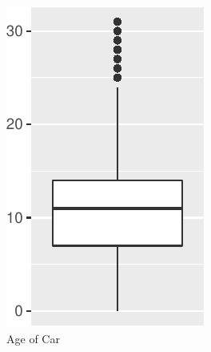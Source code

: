 \begin{figure}[H]
\begin{subfigure}{.24\textwidth}
  \includegraphics[width=\linewidth]{exploration_files/figure-latex/dist_boxplots-2.pdf}
  \caption{Age of Car}
\end{subfigure}
\begin{subfigure}{.24\textwidth}
  \centering

\end{subfigure}
\end{figure}

